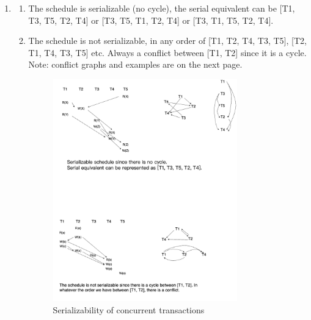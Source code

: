 \documentclass[12pt]{extarticle}
\begin{document}
\begin{flushleft}
\begin{enumerate}
\begin{enumerate}
\end{enumerate}

\item

\begin{enumerate}

\item The schedule is serializable (no cycle), the serial equivalent can be [T1, T3, T5, T2, T4] or [T3, T5, T1, T2, T4] or [T3, T1, T5, T2, T4].\\
\item The schedule is not serializable, in any order of [T1, T2, T4, T3, T5], [T2, T1, T4, T3, T5] etc. Always a conflict between [T1, T2] since it is a cycle. \\
Note: conflict graphs and examples are on the next page.

\begin{figure}[h]
  \centering
  \includegraphics[width=0.8\textwidth]{hw6_c.drawio.png}
  \caption{Serializability of concurrent transactions}
\end{figure}

\end{enumerate}

\end{enumerate}
\end{flushleft}
\end{document}
